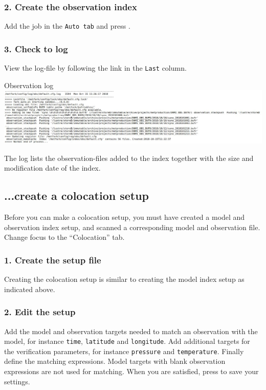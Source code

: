 \documentclass[letterpaper,10pt,twoside,twocolumn,openany]{book}
\begin{document}
{\subsubsection{2. Create the observation index}
Add the job in the \lstinline!Auto tab! and
press . 

\subsubsection{3. Check to log}
View the log-file by following the link in the \lstinline!Last! column. 
\begin{paperbox}{Observation log}
  \includegraphics[width=\columnwidth]{obslog.jpg}
\end{paperbox}
The log lists the observation-files added to the index together with the 
size and modification date of the index.

\subsection{...create a colocation setup}
Before you can make a colocation setup, you must have
created a model and observation index setup, 
and scanned a corresponding model and observation file.
Change focus to the ``Colocation'' tab. 

\subsubsection{1. Create the setup file}
Creating the colocation setup is similar to creating the model index setup as indicated above.

\subsubsection{2. Edit the setup}
Add the model and observation targets needed to match an observation with the model, for instance
\lstinline!time!, \lstinline!latitude! and \lstinline!longitude!.
Add additional targets for the verification parameters, for instance \lstinline!pressure! and \lstinline!temperature!. 
Finally define the matching expressions.
Model targets with blank observation expressions are not used for matching.
When you are satisfied, press  to save your settings.

}
\end{document}
